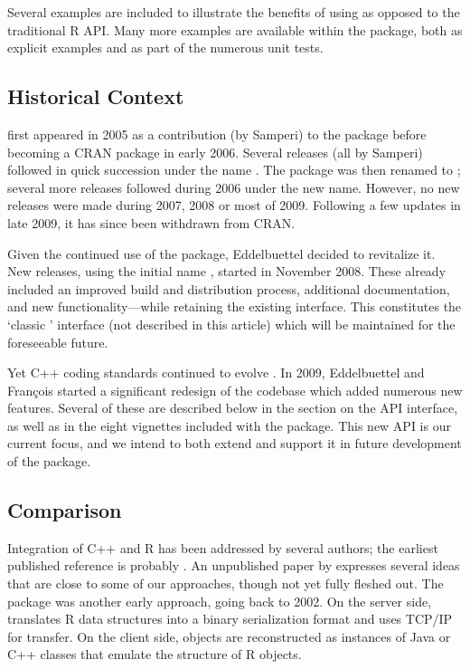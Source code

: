 Several examples are included to illustrate the benefits of using 
as opposed to the traditional R API. Many more examples are available within
the package, both as explicit examples and as part of the numerous unit tests.

\subsection{Historical Context}

 first appeared in 2005 as a contribution (by Samperi) to the
 package \citep{cran:rquantlib} before becoming a CRAN package
in early 2006. Several releases (all by Samperi) followed in quick succession
under the name . The package was then renamed to
; several more releases followed during 2006 under the new
name.  However, no new releases were made during 2007, 2008 or most of
2009. Following a few updates in late 2009, it has since been withdrawn from CRAN.

Given the continued use of the package, Eddelbuettel decided to revitalize it. New
releases, using the initial name , started in November 2008. These
already included an improved build and distribution process, additional
documentation, and new functionality---while retaining the existing
interface.  This constitutes the `classic ' interface 
(not described in this article) which will be maintained for the foreseeable future.

Yet C++ coding standards continued to evolve \citep{meyers:effectivecplusplus}.
In 2009, Eddelbuettel and Fran\c{c}ois started a significant redesign of the
codebase which added numerous new features.  Several of these are described
below in the section on the  API interface, as well as in the
eight vignettes included with the package. This new API is our current focus,
and we intend to both extend and support it in future development of the
package. 

\subsection{Comparison}

Integration of C++ and R has been addressed by several authors; the earliest
published reference is probably \cite{batesdebroy01:cppclasses}.
An unpublished paper by \cite{javagailemanly07:r_cpp} expresses several ideas
that are close to some of our approaches, though not yet fully fleshed out.
%
The  package \citep{urbanek2003:rserve,cran:Rserve} was another early approach,
going back to 2002. On the server side,  translates R data
structures into a binary serialization format and uses TCP/IP for
transfer. On the client side, objects are reconstructed as instances of Java
or C++ classes that emulate the structure of R objects. 

